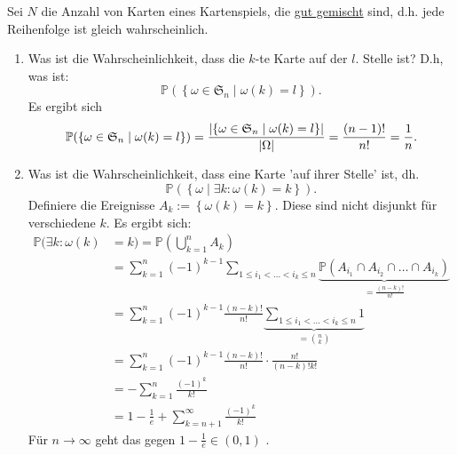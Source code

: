 \begin{exercise}
    Sei $N$ die Anzahl von Karten eines Kartenspiels, die  \underline{gut gemischt} sind, d.h. jede Reihenfolge ist gleich wahrscheinlich. 
    \begin{enumerate}[(1)]
        \item Was ist die Wahrscheinlichkeit, dass die $k$-te Karte auf der $l$. Stelle ist? D.h, was ist:
             \[
                 \mathbb{P}(\left \{\omega\in \mathfrak{S}_n \mid  \omega(k) = l\right\} )
            .\]
            Es ergibt sich
            \[
                \mathbb{P}(\left \{\omega\in \mathfrak{S}_n \mid  \omega(k) = l\right\} ) = \frac{\lvert\left \{\omega\in \mathfrak{S}_n \mid  \omega(k) = l\right\} \rvert }{\lvert\Omega\rvert } = \frac{(n-1)!}{n!} = \frac{1}{n}
            .\] 
        \item Was ist die Wahrscheinlichkeit, dass eine Karte 'auf ihrer Stelle' ist, dh.
            \[
                \mathbb{P}(\left \{\omega \mid  \exists k \colon \omega(k) = k\right\} )
            .\] 
            Definiere die Ereignisse $A_k := \left \{\omega(k) = k\right\} $. Diese sind nicht disjunkt für verschiedene $k$. Es ergibt sich:
            \begin{equation}
                \begin{split}
                    \mathbb{P}(\exists k \colon \omega(k) &= k) = \mathbb{P}\left(\bigcup_{k=1}^n A_k\right)  \\
                                                          &= \sum_{k=1}^n (-1)^{k-1} \sum_{1\leq i_1<\ldots<i_k \leq n} \underbrace{\mathbb{P}(A_{i_1} \cap A_{i_2} \cap \ldots\cap A_{i_k})}_{= \frac{(n-k)!}{n!}} \\
                                                          &= \sum_{k=1}^n (-1)^{k-1} \frac{(n-k)!}{n!} \underbrace{\sum_{1\leq i_1<\ldots<i_k \leq n} 1}_{= \binom{n}{k}} \\
                                                          &=\sum_{k=1}^n (-1)^{k-1}\frac{(n-k)!}{n!} \cdot  \frac{n!}{(n-k)! k!} \\
                                                          &= -\sum_{k=1}^n \frac{(-1)^{k} }{k!} \\
                                                          &= 1-\frac{1}{e} + \sum_{k=n+1}^{\infty} \frac{(-1)^k}{k!}
                \end{split}
            \end{equation}
            Für $n\to \infty$ geht das gegen $1-\frac{1}{e}\in (0,1)$ .
    \end{enumerate}
\end{exercise}
